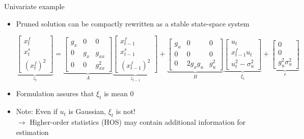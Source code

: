 \begin{frame}{Univariate example}
  \begin{itemize}
    \item Pruned solution can be compactly rewritten as a stable state-space system

          \begin{equation}
            \underbrace{\begin{bmatrix}
                x_t^f \\
                x_t^s \\
                (x_t^f)^2
              \end{bmatrix}}_{z_t} = \underbrace{\begin{bmatrix}
                g_x & 0   & 0        \\
                0   & g_x & g_{xx}   \\
                0   & 0   & g_{xx}^2
              \end{bmatrix}}_A
            \underbrace{\begin{bmatrix}
                x_{t-1}^f \\
                x_{t-1}^s \\
                (x_{t-1}^f)^2
              \end{bmatrix}}_{z_{t-1}} +  \underbrace{\begin{bmatrix}
                g_u & 0       & 0     \\
                0   & 0       & 0     \\
                0   & 2g_xg_u & g_u^2
              \end{bmatrix}}_B\underbrace{\begin{bmatrix}
                u_t           \\
                x_{t-1}^f u_t \\
                u_t^2 - \sigma_u^2
              \end{bmatrix}}_{\xi_t} + \underbrace{\begin{bmatrix}
                0 \\
                0 \\
                g_u^2 \sigma_u^2
              \end{bmatrix}}_c
          \end{equation}

    \item Formulation assures that $\xi_t$ is mean 0
    \item Note: Even if $u_t$ is Gaussian, $\xi_t$ is not!\\
          $\rightarrow$ Higher-order statistics (HOS) may contain additional information for estimation
  \end{itemize}
\end{frame}


